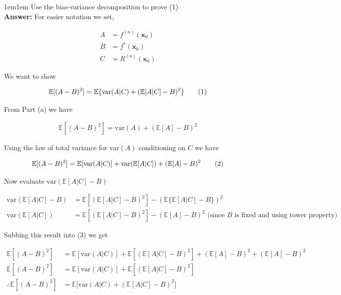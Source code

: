 \documentclass[11pt]{article}
\newcommand\numberthis{\addtocounter{equation}{1}\tag{\theequation}}
\begin{document}
\begin{adjustwidth}{1em}{1em}
        Use the bias-variance decomposition to prove (1) \\

        \textbf{Answer:} For easier notation we set,

        \begin{align*}
            A &= f^(n)(\mathbf{x}_0) \\ 
            B &= f^*(\mathbf{x}_0) \\ 
            C &= R^{(n)}(\mathbf{x}_0)
        \end{align*}

        We want to show 

        \begin{align*}
            \mathbb{E}[(A - B)^2] = \mathbb{E}\{\text{var}(A | C)  + (\mathbb{E}[A | C] - B)^2\}
            \numberthis
        \end{align*}

        From Part (a) we have 

        \begin{align*}
            \mathbb{E}[(A - B)^2] = \text{var}(A) + (\mathbb{E}[A] - B)^2
        \end{align*}

        Using the law of total variance for $\text{var}(A)$ conditioning on $C$ we have 

        \begin{align*}
            \mathbb{E}[(A - B)^2] = \mathbb{E}[\text{var}(A | C)] + \text{var}(\mathbb{E}[A | C])
            + (\mathbb{E}[A] - B)^2 \numberthis
        \end{align*}

        Now evaluate $\text{var}(\mathbb{E}[A | C] - B)$ 

        \begin{align*}
            \text{var}(\mathbb{E}[A | C] - B) &= \mathbb{E}[(\mathbb{E}[A | C] - B)^2]
            - (\mathbb{E}\{\mathbb{E}[A | C] - B\})^2 \\ 
            \text{var}(\mathbb{E}[A | C]) &= \mathbb{E}[(\mathbb{E}[A | C] - B)^2] 
            - (\mathbb{E}[A] - B)^2 \text{ (since $B$ is fixed and using tower property)}
        \end{align*}

        Subbing this result into (3) we get 

        \begin{align*}
            \mathbb{E}[(A - B)^2] &= \mathbb{E}[\text{var}(A | C)] + \mathbb{E}[(\mathbb{E}[A | C]
            - B)^2] + (\mathbb{E}[A] - B)^2 + (\mathbb{E}[A] - B)^2 \\ 
            \mathbb{E}[(A - B)^2] &= \mathbb{E}[\text{var}(A | C)] + \mathbb{E}[(\mathbb{E}[A |
            C] - B)^2] \\ 
            \therefore \mathbb{E}[(A - B)^2] &= \mathbb{E}\bigg[\text{var}(A | C) + (\mathbb{E}[A |
            C] - B)^2\bigg]
        \end{align*}
    \end{adjustwidth}
\end{document}
